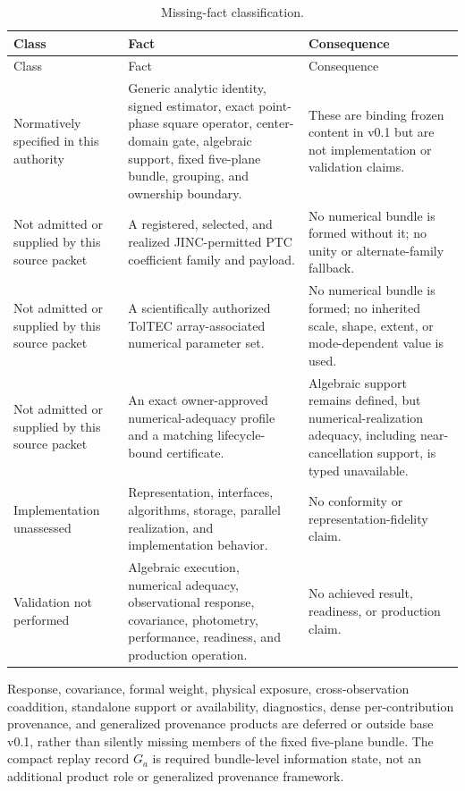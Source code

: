 \begin{longtable}{@{}>{\raggedright\arraybackslash}p{}
                        >{\raggedright\arraybackslash}p{}
                        >{\raggedright\arraybackslash}p{}@{}}
\caption{Missing-fact classification.}\label{tab:missing-facts}\\
\toprule
Class & Fact & Consequence \\
\midrule
\endfirsthead
\toprule
Class & Fact & Consequence \\
\midrule
\endhead
Normatively specified in this authority & Generic analytic identity, signed
estimator, exact point-phase square operator, center-domain gate, algebraic
support, fixed five-plane bundle, grouping, and ownership boundary. & These
are binding frozen content in v0.1 but are not implementation or validation
claims. \\
Not admitted or supplied by this source packet & A registered, selected, and realized
JINC-permitted PTC coefficient family and payload. & No numerical bundle is
formed without it; no unity or alternate-family fallback. \\
Not admitted or supplied by this source packet & A scientifically authorized TolTEC array-associated
numerical parameter set. & No numerical bundle is formed; no inherited scale,
shape, extent, or mode-dependent value is used. \\
Not admitted or supplied by this source packet & An exact owner-approved
numerical-adequacy profile and a matching lifecycle-bound certificate. &
Algebraic support remains defined, but numerical-realization adequacy,
including near-cancellation support, is typed unavailable. \\
Implementation unassessed & Representation, interfaces, algorithms, storage,
parallel realization, and implementation behavior. & No conformity or
representation-fidelity claim. \\
Validation not performed & Algebraic execution, numerical adequacy,
observational response, covariance, photometry, performance, readiness, and
production operation. & No achieved result, readiness, or production claim. \\
\bottomrule
\end{longtable}

Response, covariance, formal weight, physical exposure, cross-observation
coaddition, standalone support or availability, diagnostics, dense
per-contribution provenance, and generalized provenance products are deferred
or outside base v0.1, rather than silently missing members of the fixed
five-plane bundle.  The compact replay record $G_a$ is required bundle-level
information state, not an additional product role or generalized provenance
framework.
